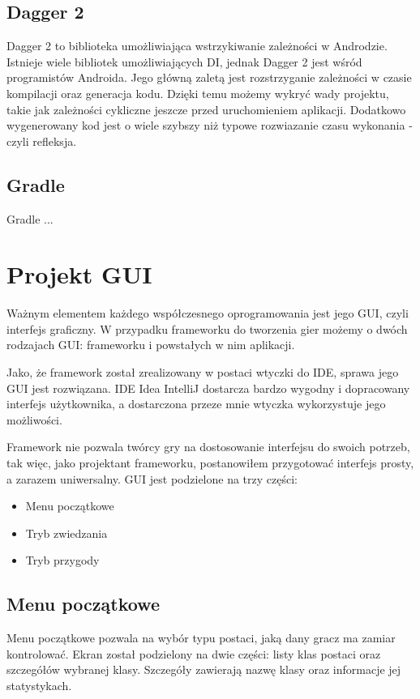\documentclass	{xmgr}
\begin{document}
\section{Dagger 2}

Dagger 2 \cite{Dagger2:2017:Doc} to biblioteka umożliwiająca wstrzykiwanie zależności w Androdzie. Istnieje wiele bibliotek umożliwiających DI, jednak Dagger 2 jest wśród programistów Androida. Jego główną zaletą jest rozstrzyganie zależności w czasie kompilacji oraz generacja kodu. Dzięki temu możemy wykryć wady projektu, takie jak zależności cykliczne jeszcze przed uruchomieniem aplikacji. Dodatkowo wygenerowany kod jest o wiele szybszy niż typowe rozwiazanie czasu wykonania - czyli refleksja.

\section{Gradle}

Gradle \cite{Gradle:2017:Doc} ...

\chapter{Projekt GUI}
Ważnym elementem każdego współczesnego oprogramowania jest jego GUI, czyli interfejs graficzny. W przypadku frameworku do tworzenia gier  możemy o dwóch rodzajach GUI: frameworku i powstałych w nim aplikacji. 

Jako, że framework został zrealizowany w postaci wtyczki do IDE, sprawa jego GUI jest rozwiązana. IDE Idea IntelliJ dostarcza bardzo wygodny i dopracowany interfejs użytkownika, a dostarczona przeze mnie wtyczka wykorzystuje jego możliwości. 

Framework nie pozwala twórcy gry na dostosowanie interfejsu do swoich potrzeb, tak więc, jako projektant frameworku, postanowiłem przygotować interfejs prosty, a zarazem uniwersalny. GUI jest podzielone na trzy części:
\begin{itemize}
	\item Menu początkowe
	\item Tryb zwiedzania
	\item Tryb przygody
\end{itemize}
\section{Menu początkowe}
Menu początkowe pozwala na wybór typu postaci, jaką dany gracz ma zamiar kontrolować. Ekran został podzielony na dwie części: listy klas postaci oraz szczegółów wybranej klasy. Szczegóły zawierają nazwę klasy oraz informacje jej statystykach.
\end{document}
